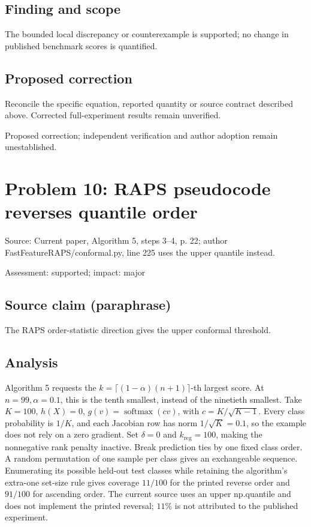 \documentclass[11pt]{article}
\begin{document}
\subsection*{Finding and scope}

The bounded local discrepancy or counterexample is supported; no change in published benchmark scores is quantified.

\subsection*{Proposed correction}

Reconcile the specific equation, reported quantity or source contract described above. Corrected full-experiment results remain unverified.

Proposed correction; independent verification and author adoption remain unestablished.

\section*{Problem 10: RAPS pseudocode reverses quantile order}

Source: Current paper, Algorithm 5, steps 3–4, p. 22; author FastFeatureRAPS/conformal.py, line 225 uses the upper quantile instead.

Assessment: supported; impact: major

\subsection*{Source claim (paraphrase)}

The RAPS order-statistic direction gives the upper conformal threshold.

\subsection*{Analysis}

Algorithm 5 requests the \(k=\lceil(1-\alpha)(n+1)\rceil\)-th largest score. At \(n=99,\alpha=0.1\), this is the tenth smallest, instead of the ninetieth smallest. Take \(K=100\), \(h(X)=0\), \(g(v)=\operatorname{softmax}(cv)\), with \(c=K/\sqrt{K-1}\). Every class probability is \(1/K\), and each Jacobian row has norm \(1/\sqrt K=0.1\), so the example does not rely on a zero gradient. Set \(\delta=0\) and \(k_{\mathrm{reg}}=100\), making the nonnegative rank penalty inactive. Break prediction ties by one fixed class order. A random permutation of one sample per class gives an exchangeable sequence. Enumerating its possible held-out test classes while retaining the algorithm’s extra-one set-size rule gives coverage \(11/100\) for the printed reverse order and \(91/100\) for ascending order. The current source uses an upper np.quantile and does not implement the printed reversal; \(11\%\) is not attributed to the published experiment.
\end{document}
